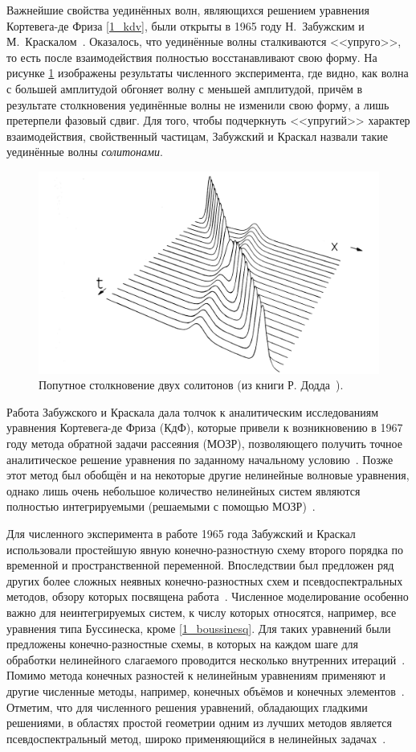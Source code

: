 \documentclass[12pt, a4paper]{report}
\begin{document}
Важнейшие свойства уединённых волн, являющихся решением уравнения Кортевега-де Фриза \eqref{1_kdv}, были открыты в 1965 году Н.~Забужским и М.~Краскалом~\cite{Zabusky}. Оказалось, что уединённые волны сталкиваются <<упруго>>, то есть после взаимодействия полностью восстанавливают свою форму.
На рисунке \ref{fig:kdv_collision} изображены результаты численного эксперимента, где видно, как волна с большей амплитудой обгоняет волну с меньшей амплитудой, причём в результате столкновения уединённые волны не изменили свою форму, а лишь претерпели фазовый сдвиг.
Для того, чтобы подчеркнуть <<упругий>> характер взаимодействия, свойственный частицам, Забужский и Краскал назвали такие уединённые волны \emph{солитонами}. 
\begin{figure}[h]
	\centering
	\includegraphics[width=0.6\linewidth]{kdv_collision.png}
	\caption{Попутное столкновение двух солитонов (из книги Р. Додда~\cite{Dodd}).}
	\label{fig:kdv_collision}
\end{figure}

Работа Забужского и Краскала дала толчок к аналитическим исследованиям уравнения Кортевега-де Фриза (КдФ), которые привели к возникновению в 1967 году метода обратной задачи рассеяния (МОЗР), позволяющего получить точное аналитическое решение уравнения по заданному начальному условию~\cite{GardnerIST}. Позже этот метод был обобщён и на некоторые другие нелинейные волновые уравнения, однако лишь очень небольшое количество нелинейных систем являются полностью интегрируемыми (решаемыми с помощью МОЗР)~\cite{Zakharov}.

Для численного эксперимента в работе 1965 года Забужский и Краскал использовали простейшую явную конечно-разностную схему второго порядка по временной и пространственной переменной. Впоследствии был предложен ряд других более сложных неявных конечно-разностных схем и псевдоспектральных методов, обзору которых посвящена работа~\cite{Taha}. Численное моделирование особенно важно для неинтегрируемых систем, к числу которых относятся, например, все уравнения типа Буссинеска, кроме \eqref{1_boussinesq}. Для таких уравнений были предложены конечно-разностные схемы, в которых на каждом шаге для обработки нелинейного слагаемого проводится несколько внутренних итераций~\cite{Christov, Kolkovska}.
Помимо метода конечных разностей к нелинейным уравнениям применяют и другие численные методы, например, конечных объёмов и конечных элементов~\cite{Dutykh_Boussinesq, Karczewska}. Отметим, что для численного решения уравнений, обладающих гладкими решениями, в областях простой геометрии одним из лучших методов является псевдоспектральный метод, широко применяющийся в нелинейных задачах~\cite{Gottlieb_Orszag, Canuto2007}.
\end{document}
